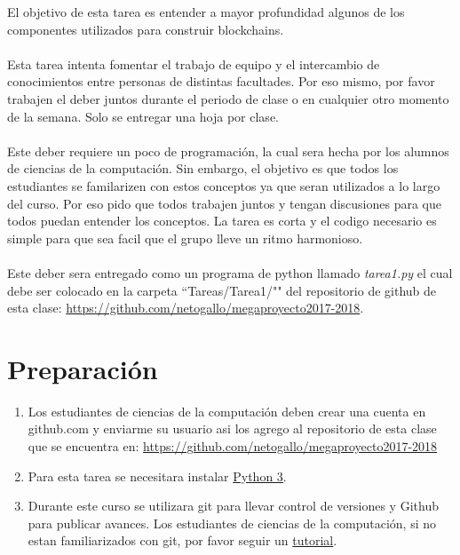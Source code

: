 \documentclass{article}
\title{Tarea #1: Introducci\'{o}n}
\begin{document}
\maketitle
El objetivo de esta tarea es entender a mayor profundidad algunos de los
componentes utilizados para construir blockchains.
\\\\
Esta tarea intenta fomentar el trabajo de equipo y el intercambio de 
conocimientos entre personas de distintas facultades. Por eso mismo, 
por favor trabajen el deber juntos durante el periodo de clase 
o en cualquier otro momento de la semana. Solo se entregar una hoja por
clase.
\\\\
Este deber requiere un poco de programaci\'{o}n, la cual sera hecha por los
alumnos de ciencias de la computaci\'{o}n. Sin embargo, el objetivo es que todos
los estudiantes se familarizen con estos conceptos ya que seran utilizados a lo
largo del curso. Por eso pido que todos trabajen juntos y tengan discusiones
para que todos puedan entender los conceptos. La tarea es corta y el codigo
necesario es simple para que sea facil que el grupo lleve un ritmo harmonioso.
\\\\
Este deber sera entregado como un programa de python llamado \emph{tarea1.py} el cual
debe ser colocado en la carpeta ``Tareas/Tarea1/"" del repositorio de github de esta
clase: \url{https://github.com/netogallo/megaproyecto2017-2018}.

\section{Preparaci\'{o}n}
\begin{enumerate}
\item{Los estudiantes de ciencias de la computaci\'{o}n 
    deben crear una cuenta en github.com y enviarme 
    su usuario asi los agrego al repositorio de esta 
    clase que se encuentra en: \url{https://github.com/netogallo/megaproyecto2017-2018}}
\item{Para esta tarea se necesitara instalar 
    \href{https://www.python.org/downloads/release/python-361/}{Python 3}.}
\item{Durante este curso se utilizara git para llevar control de versiones y Github para 
    publicar avances. Los estudiantes de ciencias de la computación, si 
    no estan familiarizados con git, por favor seguir un 
    \href{https://try.github.io/levels/1/challenges/1}{tutorial}.}
\end{enumerate}
\end{document}
